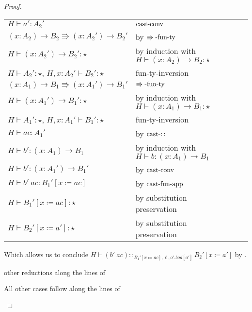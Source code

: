 \begin{proof}
\begin{casenv}
\begin{casenv}
   \begin{tabular}{llll}
     $H\vdash a':A_{2}'$ & $\operatorname{cast-conv}$\tabularnewline
     $\left(x:A_{2}\right)\rightarrow B_{2}\Rrightarrow\left(x:A_{2}'\right)\rightarrow B_{2}'$ & by $\operatorname{\Rrightarrow -fun-ty}$\tabularnewline
     $H\vdash\left(x:A_{2}'\right)\rightarrow B_{2}':\star$ & \makecell[l]{by induction with \\ $H\vdash\left(x:A_{2}\right)\rightarrow B_{2}:\star$} \tabularnewline
     $H\vdash A_{2}':\star$, $H,x:A_{2}'\vdash B_{2}':\star$ & fun-ty-inversion \tabularnewline
     $\left(x:A_{1}\right)\rightarrow B_{1}\Rrightarrow\left(x:A_{1}'\right)\rightarrow B_{1}'$ & $\operatorname{\Rrightarrow -fun-ty}$ \tabularnewline
     $H\vdash\left(x:A_{1}'\right)\rightarrow B_{1}':\star$ & \makecell[l]{by induction with \\ $H\vdash\left(x:A_{1}\right)\rightarrow B_{1}:\star$} \tabularnewline
     $H\vdash A_{1}':\star$, $H,x:A_{1}'\vdash B_{1}':\star$ & fun-ty-inversion\tabularnewline
     $H\vdash ac:A_{1}'$ & by $\operatorname{cast-::}$\tabularnewline
     $H\vdash b':\left(x:A_{1}\right)\rightarrow B_{1}$ & \makecell[l]{by induction with \\ $H\vdash b:\left(x:A_{1}\right)\rightarrow B_{1}$} \tabularnewline
     $H\vdash b':\left(x:A_{1}'\right)\rightarrow B_{1}'$ & by $\operatorname{cast-conv}$\tabularnewline
     $H\vdash b'\ ac:B_{1}'\left[x\coloneqq ac\right]$ & by $\operatorname{cast-fun-app}$\tabularnewline
     $H\vdash B_{1}'\left[x\coloneqq ac\right]:\star$ & by substitution preservation\tabularnewline
     $H\vdash B_{2}'\left[x\coloneqq a'\right]:\star$ & by substitution preservation\tabularnewline
     \end{tabular}
     Which allows us to conclude $H\vdash\left(b'\ ac\right)::_{B_{1}'\left[x\coloneqq ac\right],\ell ,o'.bod[a']}B_{2}'\left[x\coloneqq a'\right]$ by .
 
   \item other reductions along the lines of 
 \end{casenv}
 \item All other cases follow along the lines of 
\end{casenv}
 
 
\end{proof}
 
